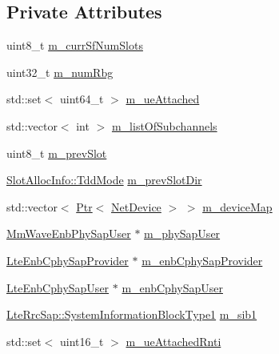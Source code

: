 \subsection*{Private Attributes}
\begin{DoxyCompactItemize}
\item 
uint8\+\_\+t \hyperlink{classns3_1_1MmWaveEnbPhy_a009230227393f4585df5440133f1a52b}{m\+\_\+curr\+Sf\+Num\+Slots}
\item 
uint32\+\_\+t \hyperlink{classns3_1_1MmWaveEnbPhy_a4f5ae1386b8d7ab3edf6a54703184813}{m\+\_\+num\+Rbg}
\item 
std\+::set$<$ uint64\+\_\+t $>$ \hyperlink{classns3_1_1MmWaveEnbPhy_ae65ce74b0d1344c5c5b542fa29549973}{m\+\_\+ue\+Attached}
\item 
std\+::vector$<$ int $>$ \hyperlink{classns3_1_1MmWaveEnbPhy_aa13c933468e02fe5f7f10a6a68cea43e}{m\+\_\+list\+Of\+Subchannels}
\item 
uint8\+\_\+t \hyperlink{classns3_1_1MmWaveEnbPhy_a4e01aff86dbfdfad888e7e08645535d8}{m\+\_\+prev\+Slot}
\item 
\hyperlink{structns3_1_1SlotAllocInfo_a6cad60db1d39034f1851e2cea625fe5d}{Slot\+Alloc\+Info\+::\+Tdd\+Mode} \hyperlink{classns3_1_1MmWaveEnbPhy_a92d3298da69cf554e4bd1ed5dbf37a08}{m\+\_\+prev\+Slot\+Dir}
\item 
std\+::vector$<$ \hyperlink{classns3_1_1Ptr}{Ptr}$<$ \hyperlink{classns3_1_1NetDevice}{Net\+Device} $>$ $>$ \hyperlink{classns3_1_1MmWaveEnbPhy_a4b6fe922f96dd05597a1fe2f9a523ce9}{m\+\_\+device\+Map}
\item 
\hyperlink{classns3_1_1MmWaveEnbPhySapUser}{Mm\+Wave\+Enb\+Phy\+Sap\+User} $\ast$ \hyperlink{classns3_1_1MmWaveEnbPhy_a666331e7a8200a6b17215bdda089f671}{m\+\_\+phy\+Sap\+User}
\item 
\hyperlink{classns3_1_1LteEnbCphySapProvider}{Lte\+Enb\+Cphy\+Sap\+Provider} $\ast$ \hyperlink{classns3_1_1MmWaveEnbPhy_a06aa17cb3a6b1d376db7dfc8efe56499}{m\+\_\+enb\+Cphy\+Sap\+Provider}
\item 
\hyperlink{classns3_1_1LteEnbCphySapUser}{Lte\+Enb\+Cphy\+Sap\+User} $\ast$ \hyperlink{classns3_1_1MmWaveEnbPhy_ac5d84411029763cff0e7a1437c3a9397}{m\+\_\+enb\+Cphy\+Sap\+User}
\item 
\hyperlink{structns3_1_1LteRrcSap_1_1SystemInformationBlockType1}{Lte\+Rrc\+Sap\+::\+System\+Information\+Block\+Type1} \hyperlink{classns3_1_1MmWaveEnbPhy_a772e412012e0b50873b4e250de2696a2}{m\+\_\+sib1}
\item 
std\+::set$<$ uint16\+\_\+t $>$ \hyperlink{classns3_1_1MmWaveEnbPhy_ab46ab3660a2a3be573ae70bb1eaf2908}{m\+\_\+ue\+Attached\+Rnti}

\end{DoxyCompactItemize}

